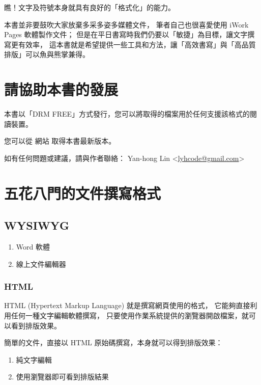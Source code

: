 \documentclass[a4paper,12pt,english]{sphinxmanual}
\begin{document}
瞧！文字及符號本身就具有良好的「格式化」的能力。

本書並非要鼓吹大家放棄多采多姿多媒體文件，
筆者自己也很喜愛使用 iWork Pages 軟體製作文件；
但是在平日書寫時我們仍要以「敏捷」為目標，讓文字撰寫更有效率，
這本書就是希望提供一些工具和方法，讓「高效書寫」與「高品質排版」可以魚與熊掌兼得。


\chapter{請協助本書的發展}
\label{copyright::doc}\label{copyright:id1}
本書以「DRM FREE」方式發行，您可以將取得的檔案用於任何支援該格式的閱讀裝置。

您可以從 網站 取得本書最新版本。

如有任何問題或建議，請與作者聯絡： Yan-hong Lin \textless{}\href{mailto:lyhcode@gmail.com}{lyhcode@gmail.com}\textgreater{}


\chapter{五花八門的文件撰寫格式}
\label{syntax::doc}\label{syntax:id1}

\section{WYSIWYG}
\label{syntax:wysiwyg}\begin{enumerate}
\item {} 
Word 軟體

\item {} 
線上文件編輯器

\end{enumerate}


\subsection{HTML}
\label{syntax:html}
HTML (Hypertext Markup Language) 就是撰寫網頁使用的格式，
它能夠直接利用任何一種文字編輯軟體撰寫，
只要使用作業系統提供的瀏覽器開啟檔案，就可以看到排版效果。

簡單的文件，直接以 HTML 原始碼撰寫，本身就可以得到排版效果：
\begin{enumerate}
\item {} 
純文字編輯

\item {} 
使用瀏覽器即可看到排版結果

\end{enumerate}
\end{document}

